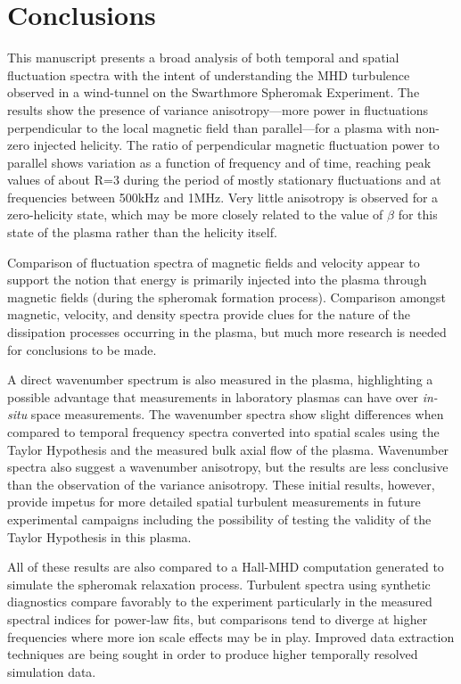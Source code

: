 \documentclass[aip,prl,amsmath,amssymb,reprint,superscriptaddress]{revtex4-1} %
\begin{document}
\section{Conclusions}\label{sec:conclusions}

This manuscript presents a broad analysis of both temporal and spatial fluctuation spectra with the intent of understanding the MHD turbulence observed in a wind-tunnel on the Swarthmore Spheromak Experiment. The results show the presence of variance anisotropy---more power in fluctuations perpendicular to the local magnetic field than parallel---for a plasma with non-zero injected helicity. The ratio of perpendicular magnetic fluctuation power to parallel shows variation as a function of frequency and of time, reaching peak values of about R=3 during the period of mostly stationary fluctuations and at frequencies between 500kHz and 1MHz. Very little anisotropy is observed for a zero-helicity state, which may be more closely related to the value of $\beta$ for this state of the plasma rather than the helicity itself.

Comparison of fluctuation spectra of magnetic fields and velocity appear to support the notion that energy is primarily injected into the plasma through magnetic fields (during the spheromak formation process). Comparison amongst magnetic, velocity, and density spectra provide clues for the nature of the dissipation processes occurring in the plasma, but much more research is needed for conclusions to be made.

A direct wavenumber spectrum is also measured in the plasma, highlighting a possible advantage that measurements in laboratory plasmas can have over {\it in-situ} space measurements. The wavenumber spectra show slight differences when compared to temporal frequency spectra converted into spatial scales using the Taylor Hypothesis and the measured bulk axial flow of the plasma. Wavenumber spectra also suggest a wavenumber anisotropy, but the results are less conclusive than the observation of the variance anisotropy. These initial results, however, provide impetus for more detailed spatial turbulent measurements in future experimental campaigns including the possibility of testing the validity of the Taylor Hypothesis in this plasma.

All of these results are also compared to a Hall-MHD computation generated to simulate the spheromak relaxation process. Turbulent spectra using synthetic diagnostics compare favorably to the experiment particularly in the measured spectral indices for power-law fits, but comparisons tend to diverge at higher frequencies where more ion scale effects may be in play. Improved data extraction techniques are being sought in order to produce higher temporally resolved simulation data.
\end{document}
